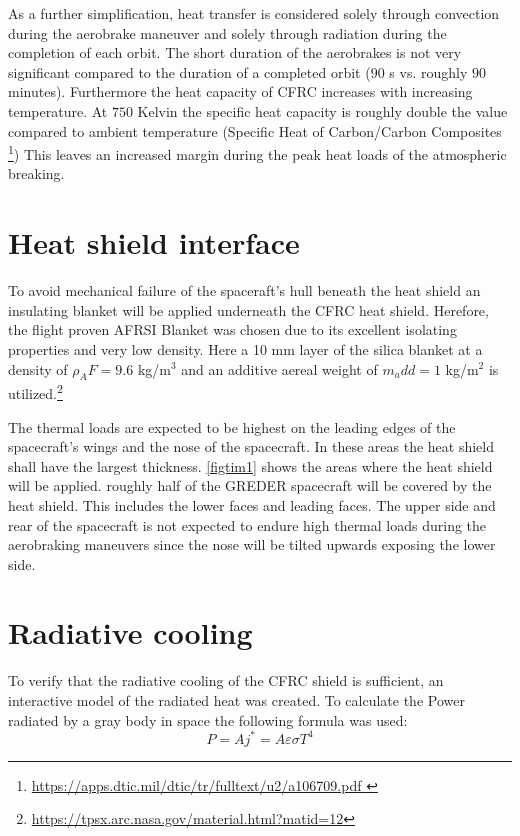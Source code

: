 As a further simplification, heat transfer is considered solely through convection during the aerobrake maneuver and solely through radiation during the completion of each orbit. The short duration of the aerobrakes is not very significant compared to the duration of a completed orbit ($90$ s vs. roughly $90$ minutes). Furthermore the heat capacity of CFRC increases with increasing temperature. At $750$ Kelvin the specific heat capacity is roughly double the value compared to ambient temperature (Specific Heat of Carbon/Carbon Composites \footnote{\url{https://apps.dtic.mil/dtic/tr/fulltext/u2/a106709.pdf }}) This leaves an increased margin during the peak heat loads of the atmospheric breaking.

\section{Heat shield interface}

\qquad To avoid mechanical failure of the spaceraft's hull beneath the heat shield an insulating blanket will be applied underneath the CFRC heat shield. Herefore, the flight proven AFRSI Blanket was chosen due
to its excellent isolating properties and very low density. Here a 10 mm layer of the silica blanket at a density of $\rho_AF = 9.6$ kg/m$^3$ and an additive aereal weight of $m_add = 1$ kg/m$^2$ is utilized.\footnote{\url{https://tpsx.arc.nasa.gov/material.html?matid=12}}

The thermal loads are expected to be highest on the leading edges of the spacecraft's wings and the nose of the spacecraft. In these areas the heat shield shall have the largest thickness. \autoref{figtim1} shows the areas where the heat shield will be applied. roughly half of the GREDER spacecraft will be covered by the heat shield. This includes the lower faces and leading faces. The upper side and rear of the spacecraft is not expected to endure high thermal loads during the aerobraking maneuvers since the nose will be tilted upwards exposing the lower side.

\section{Radiative cooling}
\qquad To verify that the radiative cooling of the CFRC shield is sufficient, an interactive model of the radiated heat was created. To calculate the Power radiated by a gray body in space the following formula was used:
\begin{equation}
	P = Aj^* = A\varepsilon\sigma T^4
\end{equation}

